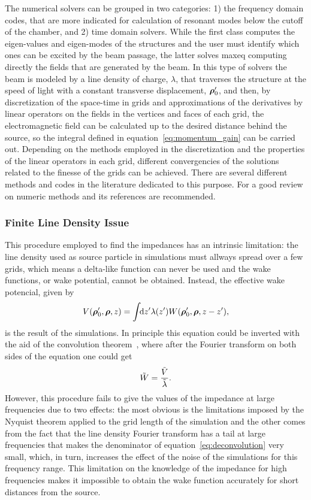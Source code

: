     The numerical solvers can be grouped in two categories: 1) the frequency domain codes, that are more indicated for calculation of resonant modes below the cutoff of the chamber, and 2) time domain solvers. While the first class computes the eigen-values and eigen-modes of the structures and the user must identify which ones can be excited by the beam passage, the latter solves \gls{maxeq} computing directly the fields that are generated by the beam. In this type of solvers the beam is modeled by a line density of charge, $\lambda$, that traverses the structure at the speed of light with a constant transverse displacement, $\boldsymbol{\rho}'_0$, and then, by discretization of the space-time in grids and approximations of the derivatives by linear operators on the fields in the vertices and faces of each grid, the electromagnetic field can be calculated up to the desired distance behind the source, so the integral defined in equation~\eqref{eq:momentum_gain} can be carried out. Depending on the methods employed in the discretization and the properties of the linear operators in each grid, different convergencies of the solutions related to the finesse of the grids can be achieved. There are several different methods and codes in the literature dedicated to this purpose. For a good review on numeric methods  and its references are recommended.

\subsubsection{Finite Line Density Issue}

    This procedure employed to find the impedances has an intrinsic limitation: the line density used as source particle in simulations must allways spread over a few grids, which means a delta-like function can never be used and the wake functions, or wake potential, cannot be obtained. Instead, the effective wake potencial, given by
    \begin{align}
        V(\boldsymbol{\rho}'_0, \boldsymbol{\rho}, z) = \int\!\!\text{d}z' 
                \lambda(z') W(\boldsymbol{\rho}'_0,\boldsymbol{\rho},z-z'),
    \end{align}
    is the result of the simulations. In principle this equation could be inverted with the aid of the convolution theorem~\cite{wiki2017a}, where after the Fourier transform on both sides of the equation one could get
    \begin{align}\label{eq:deconvolution}
        \tilde{W} = \frac{\tilde{V}}{\tilde{\lambda}}.
    \end{align}
    However, this procedure fails to give the values of the impedance at large frequencies due to two effects: the most obvious is the limitations imposed by the Nyquist theorem applied to the grid length of the simulation and the other comes from the fact that the line density Fourier transform has a tail at large frequencies that makes the denominator of equation~\eqref{eq:deconvolution} very small, which, in turn, increases the effect of the noise of the simulations for this frequency range. This limitation on the knowledge of the impedance for high frequencies makes it impossible to obtain the wake function accurately for short distances from the source.

